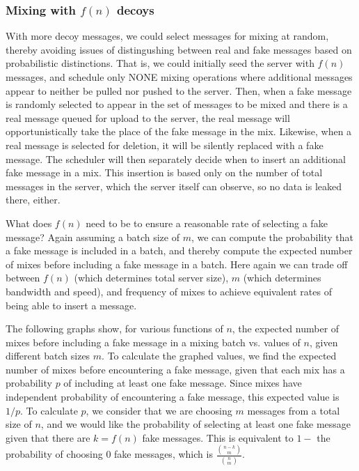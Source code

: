 \documentclass[pageno]{jpaper}
\begin{document}
\subsubsection{Mixing with \texorpdfstring{$f(n)$}{f(n)} decoys}
\label{fofn}
With more decoy messages, we could select messages for mixing at random, thereby avoiding issues of distingushing between real and fake messages based on probabilistic distinctions. That is, we could initially seed the server with $f(n)$ messages, and schedule only NONE mixing operations where additional messages appear to neither be pulled nor pushed to the server. Then, when a fake message is randomly selected to appear in the set of messages to be mixed and there is a real message queued for upload to the server, the real message will opportunistically take the place of the fake message in the mix. Likewise, when a real message is selected for deletion, it will be silently replaced with a fake message. The scheduler will then separately decide when to insert an additional fake message in a mix. This insertion is based only on the number of total messages in the server, which the server itself can observe, so no data is leaked there, either.

What does $f(n)$ need to be to ensure a reasonable rate of selecting a fake message? Again assuming a batch size of $m$, we can compute the probability that a fake message is included in a batch, and thereby compute the expected number of mixes before including a fake message in a batch. Here again we can trade off between $f(n)$ (which determines total server size), $m$ (which determines bandwidth and speed), and frequency of mixes to achieve equivalent rates of being able to insert a message.

The following graphs show, for various functions of $n$, the expected number of mixes before including a fake message in a mixing batch vs. values of $n$, given different batch sizes $m$. To calculate the graphed values, we find the expected number of mixes before encountering a fake message, given that each mix has a probability $p$ of including at least one fake message. Since mixes have independent probability of encountering a fake message, this expected value is $1/p$. To calculate $p$, we consider that we are choosing $m$ messages from a total size of $n$, and we would like the probability of selecting at least one fake message given that there are $k=f(n)$ fake messages. This is equivalent to $1-$ the probability of choosing 0 fake messages, which is $\frac{{{n-k}\choose m}}{{n \choose m}}$.
\end{document}
